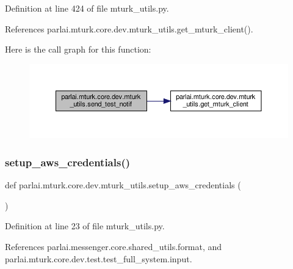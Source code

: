 Definition at line 424 of file mturk\+\_\+utils.\+py.



References parlai.\+mturk.\+core.\+dev.\+mturk\+\_\+utils.\+get\+\_\+mturk\+\_\+client().

Here is the call graph for this function\+:
\nopagebreak
\begin{figure}[H]
\begin{center}
\leavevmode
\includegraphics[width=350pt]{namespaceparlai_1_1mturk_1_1core_1_1dev_1_1mturk__utils_abfc17443a7c8018fc56dcc058e7b86f1_cgraph}
\end{center}
\end{figure}
\mbox{\label{namespaceparlai_1_1mturk_1_1core_1_1dev_1_1mturk__utils_a086d7381c328214587d3ec28bbcd19ab}} 
\subsubsection{\texorpdfstring{setup\+\_\+aws\+\_\+credentials()}{setup\_aws\_credentials()}}
{\footnotesize\ttfamily def parlai.\+mturk.\+core.\+dev.\+mturk\+\_\+utils.\+setup\+\_\+aws\+\_\+credentials (\begin{DoxyParamCaption}{ }\end{DoxyParamCaption})}



Definition at line 23 of file mturk\+\_\+utils.\+py.



References parlai.\+messenger.\+core.\+shared\+\_\+utils.\+format, and parlai.\+mturk.\+core.\+dev.\+test.\+test\+\_\+full\+\_\+system.\+input.

\mbox{\label{namespaceparlai_1_1mturk_1_1core_1_1dev_1_1mturk__utils_a01315ef04ead23e4c1a84c027dcccf3f}} 
